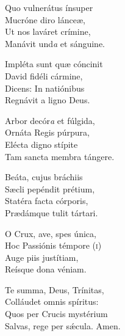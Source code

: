 Quo vulnerátus ínsuper\\
Mucróne diro lánceæ,\\
Ut nos laváret crímine,\\
Manávit und\textit{a} et sánguine.

Impléta sunt quæ cóncinit\\
David fidéli cármine,\\
Dicens: In natiónibus\\
Regnávit a ligno Deus.

Arbor decór\textit{a} et fúlgida,\\
Ornáta Regis púrpura,\\
Elé\-cta digno stípite\\
Tam san\-cta membra tángere.

Beáta, cujus bráchiis\\
Sæcli pepéndit prétium,\\
Statéra fa\-cta córporis,\\
Prædámque tulit tártari.

O Crux, ave, spes única, \\
Hoc Passiónis témpore (\textsc{i}) \\
Auge piis justítiam,\\
Reísque dona véniam.

Te summa, Deus, Trínitas,\\
Colláudet omnis spíritus:\\
Quos per Crucis mystérium\\
Salvas, rege per sǽcula.
Amen.

%
